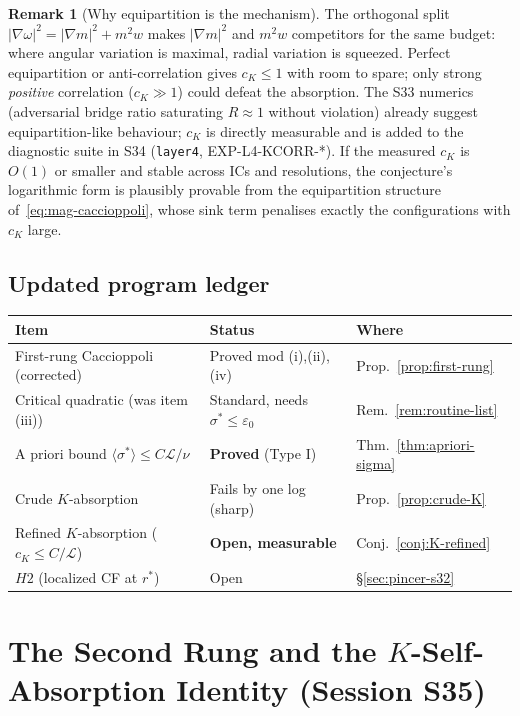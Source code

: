 \documentclass[11pt]{article}
\theoremstyle{definition}
\newtheorem{remark}[theorem]{Remark}
\theoremstyle{remark}
\begin{document}
\begin{remark}[Why equipartition is the mechanism]
  The orthogonal split $|\nabla\omega|^2 = |\nabla m|^2 + m^2 w$ makes
  $|\nabla m|^2$ and $m^2w$ competitors for the same budget: where angular
  variation is maximal, radial variation is squeezed. Perfect equipartition
  or anti-correlation gives $c_K\leq 1$ with room to spare; only strong
  \emph{positive} correlation ($c_K\gg 1$) could defeat the absorption.
  The S33 numerics (adversarial bridge ratio saturating $R\approx 1$
  without violation) already suggest equipartition-like behaviour;
  $c_K$ is directly measurable and is added to the diagnostic suite in S34
  (\texttt{layer4}, EXP-L4-KCORR-*). If the measured $c_K$ is $O(1)$ or
  smaller and stable across ICs and resolutions, the conjecture's
  logarithmic form is plausibly provable from the equipartition structure
  of~\eqref{eq:mag-caccioppoli}, whose sink term penalises exactly the
  configurations with $c_K$ large.
\end{remark}

\subsection{Updated program ledger}

\begin{center}
\begin{tabular}{lll}
\hline
Item & Status & Where \\
\hline
First-rung Caccioppoli (corrected) & Proved mod (i),(ii),(iv) & Prop.~\ref{prop:first-rung} \\
Critical quadratic (was item (iii)) & Standard, needs $\sigma^*\leq\varepsilon_0$ & Rem.~\ref{rem:routine-list} \\
A priori bound $\langle\sigma^*\rangle\leq C\mathcal{L}/\nu$ & \textbf{Proved} (Type I) & Thm.~\ref{thm:apriori-sigma} \\
Crude $K$-absorption & Fails by one log (sharp) & Prop.~\ref{prop:crude-K} \\
Refined $K$-absorption ($c_K\leq C/\mathcal{L}$) & \textbf{Open, measurable} & Conj.~\ref{conj:K-refined} \\
$H2$ (localized CF at $r^*$) & Open & \S\ref{sec:pincer-s32} \\
\hline
\end{tabular}
\end{center}

\section{The Second Rung and the $K$-Self-Absorption Identity (Session S35)}
\label{sec:secondrung-s35}
\end{document}
